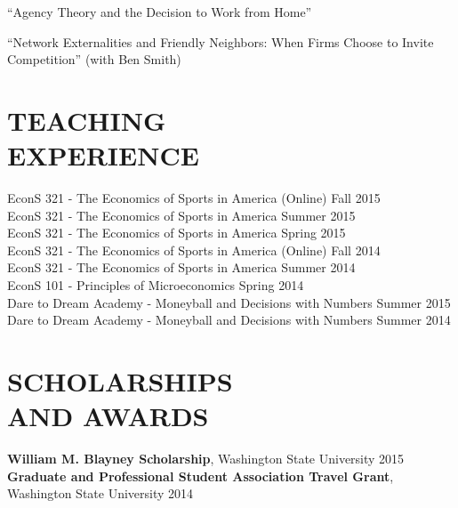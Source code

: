 \documentclass[margin]{res}  %
\begin{document}
\begin{resume}
``Agency Theory and the Decision to Work from Home''

``Network Externalities and Friendly Neighbors: When Firms Choose to Invite Competition'' (with Ben Smith)

\section{\textnormal{TEACHING \\EXPERIENCE}}

EconS 321 - The Economics of Sports in America (Online) \hfill Fall 2015 \\
EconS 321 - The Economics of Sports in America \hfill Summer 2015 \\
EconS 321 - The Economics of Sports in America \hfill Spring 2015 \\
EconS 321 - The Economics of Sports in America (Online) \hfill Fall 2014 \\
EconS 321 - The Economics of Sports in America \hfill Summer 2014 \\[12pt]
EconS 101 - Principles of Microeconomics \hfill Spring 2014 \\[12pt]
Dare to Dream Academy - Moneyball and Decisions with Numbers \hfill Summer 2015 \\
Dare to Dream Academy - Moneyball and Decisions with Numbers \hfill Summer 2014 \\

%


\section{\textnormal{SCHOLARSHIPS\\AND AWARDS}}
\textbf{William M. Blayney Scholarship}, Washington State University \hfill 2015 \\[12pt]
\textbf{Graduate and Professional Student Association Travel Grant},\\ Washington State University \hfill 2014 \\



\end{resume}
\end{document}
